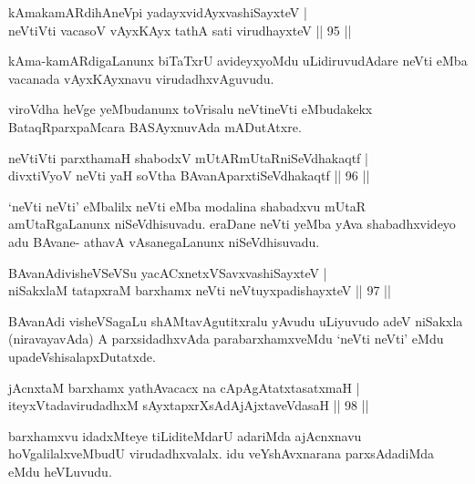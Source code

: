 \begin{shl}
kAmakamARdihAneV\s pi yadayxvidAyx\s vashiSayxteV |\\
neVtiVti vacasoV vAyxKAyx tathA sati virudhayxteV \hfill || 95 ||
\end{shl}

\begin{artha}
kAma-kamARdigaLanunx biTaTxrU avideyxyoMdu uLidiruvudAdare neVti eMba vacanada vAyxKAyxnavu virudadhxvAguvudu.
\end{artha}

\begin{artha}
viroVdha heVge yeMbudanunx toVrisalu neVtineVti eMbudakekx BataqRparxpaMcara BASAyxnuvAda mADutAtxre.
\end{artha}

\begin{shl}
neVtiVti parxthamaH shabodxV mUtARmUtaRniSeVdhakaqtf |\\
divxtiVyoV neVti yaH soV\s tha BAvanAparxtiSeVdhakaqtf \hfill || 96 ||
\end{shl}

\begin{artha}
`neVti neVti' eMbalilx neVti eMba modalina shabadxvu mUtaR amUtaRgaLanunx niSeVdhisuvadu. eraDane neVti yeMba yAva shabadhxvideyo adu BAvane- athavA vAsanegaLanunx niSeVdhisuvadu.
\end{artha}


\begin{shl}
BAvanAdivisheVSeVSu yacACxnetxVSavxvashiSayxteV |\\
niSakxlaM tatapxraM barxhamx neVti neVtuyxpadishayxteV \hfill || 97 ||
\end{shl}

\begin{artha}
BAvanAdi visheVSagaLu shAMtavAgutitxralu yAvudu uLiyuvudo adeV niSakxla (niravayavAda) A parxsidadhxvAda parabarxhamxveMdu `neVti neVti' eMdu upadeVshisalapxDutatxde.
\end{artha}

\begin{shl}
jAcnxtaM barxhamx yathAvacacx na cApAgAtatxtasatxmaH |\\
iteyxVtadavirudadhxM sAyxtapxrXsAdAjAjxtaveVdasaH \hfill || 98 ||
\end{shl}

\begin{artha}
barxhamxvu idadxMteye tiLiditeMdarU adariMda ajAcnxnavu hoVgalilalxveMbudU virudadhxvalalx. idu veYshAvxnarana parxsAdadiMda eMdu heVLuvudu.
\end{artha}

